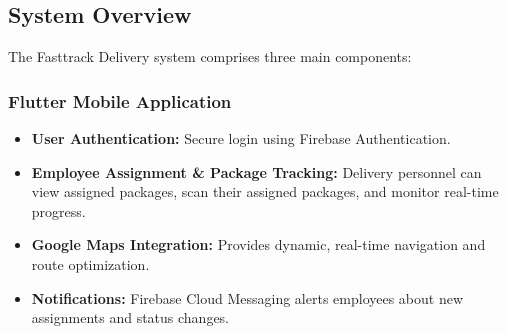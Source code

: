 \documentclass{article}
\begin{document}
\subsection{System Overview}
The Fasttrack Delivery system comprises three main components:

\subsubsection{Flutter Mobile Application}
\begin{itemize}
    \item \textbf{User Authentication:} Secure login using Firebase Authentication.
    \item \textbf{Employee Assignment \& Package Tracking:} Delivery personnel can view assigned packages, scan their assigned packages, and monitor real-time progress.
    \item \textbf{Google Maps Integration:} Provides dynamic, real-time navigation and route optimization.
    \item \textbf{Notifications:} Firebase Cloud Messaging alerts employees about new assignments and status changes.
\end{itemize}
\end{document}
